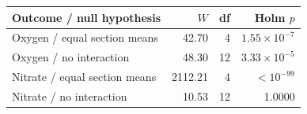 \begin{tabular}{lrrr}
\toprule
Outcome / null hypothesis & $W$ & df & Holm $p$ \\
\midrule
Oxygen / equal section means & 42.70 & 4 & $1.55\times10^{-7}$ \\
Oxygen / no interaction & 48.30 & 12 & $3.33\times10^{-5}$ \\
Nitrate / equal section means & 2112.21 & 4 & $<10^{-99}$ \\
Nitrate / no interaction & 10.53 & 12 & 1.0000 \\
\bottomrule
\end{tabular}
